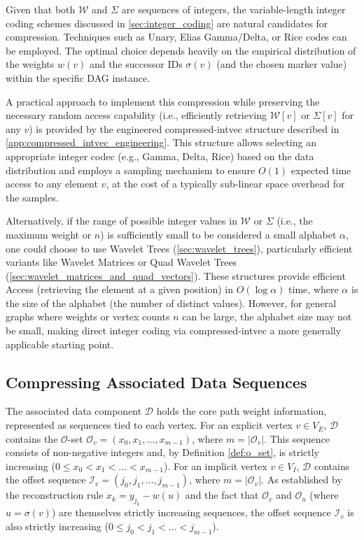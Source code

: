 Given that both $\mathcal{W}$ and $\Sigma$ are sequences of integers, the variable-length integer coding schemes discussed in \autoref{sec:integer_coding} are natural candidates for compression. Techniques such as Unary, Elias Gamma/Delta, or Rice codes can be employed. The optimal choice depends heavily on the empirical distribution of the weights $w(v)$ and the successor IDs $\sigma(v)$ (and the chosen marker value) within the specific DAG instance.

A practical approach to implement this compression while preserving the necessary random access capability (i.e., efficiently retrieving $\mathcal{W}[v]$ or $\Sigma[v]$ for any $v$) is provided by the engineered \textsf{compressed-intvec} structure described in \autoref{app:compressed_intvec_engineering}. This structure allows selecting an appropriate integer codec (e.g., Gamma, Delta, Rice) based on the data distribution and employs a sampling mechanism to ensure $O(1)$ expected time access to any element $v$, at the cost of a typically sub-linear space overhead for the samples.

Alternatively, if the range of possible integer values in $\mathcal{W}$ or $\Sigma$ (i.e., the maximum weight or $n$) is sufficiently small to be considered a small alphabet $\alpha$, one could choose to use Wavelet Trees (\autoref{sec:wavelet_trees}), particularly efficient variants like Wavelet Matrices or Quad Wavelet Trees (\autoref{sec:wavelet_matrices_and_quad_vectors}). These structures provide efficient Access (retrieving the element at a given position) in $O(\log \alpha)$ time, where $\alpha$ is the size of the alphabet (the number of distinct values). However, for general graphs where weights or vertex counts $n$ can be large, the alphabet size may not be small, making direct integer coding via \textsf{compressed-intvec} a more generally applicable starting point.

\subsection{Compressing Associated Data Sequences}
\label{subsec:compressing_associated_data_sequences}

The associated data component $\mathcal{D}$ holds the core path weight information, represented as sequences tied to each vertex. For an explicit vertex $v \in V_E$, $\mathcal{D}$ contains the $\mathcal{O}$-set $\mathcal{O}_v = (x_0, x_1, \dots, x_{m-1})$, where $m = |\mathcal{O}_v|$. This sequence consists of non-negative integers and, by Definition \ref{def:o_set}, is strictly increasing ($0 \le x_0 < x_1 < \dots < x_{m-1}$).
For an implicit vertex $v \in V_I$, $\mathcal{D}$ contains the offset sequence $\mathcal{I}_v = (j_0, j_1, \dots, j_{m-1})$, where $m = |\mathcal{O}_v|$. As established by the reconstruction rule $x_k = y_{j_k} - w(u)$ and the fact that $\mathcal{O}_v$ and $\mathcal{O}_u$ (where $u=\sigma(v)$) are themselves strictly increasing sequences, the offset sequence $\mathcal{I}_v$ is also strictly increasing ($0 \le j_0 < j_1 < \dots < j_{m-1}$).

